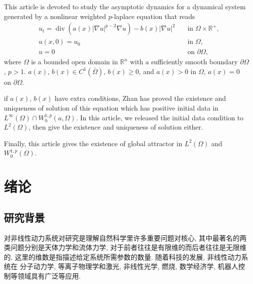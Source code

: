 \documentclass[twoside,longtitle]{LZUthesis}
\theoremstyle{definition}
\numberwithin{equation}{chapter}
\newcommand*\abs[1]{\lvert#1\rvert}
\newcommand\R{\mathbb{R}}
\DeclareMathOperator{\Div}{div}
\begin{document}

\begin{englishabstract}
This article is devoted to study the asymptotic dynamics for a dynamical system generated by a nonlinear
weighted $p$-laplace equation that reads
\begin{equation}\label{eq:main}
\begin{alignedat}{2}
& u_t = \Div(a(x)\abs{\nabla u}^{p-2}\nabla u) - b(x)\abs{\nabla u}^2 \quad &\text{in } \Omega \times \R^+,\\
& u(x,0) = u_0 \quad &\text{in } \Omega,\\
& u = 0 \quad &\text{on } \partial\Omega,
\end{alignedat}
\end{equation}
where $\Omega$ is a bounded open domain in $\R^{n}$ with a sufficiently smooth boundary $\partial\Omega$, $p>1$.
$ a(x)$, $b(x) \in C^1(\bar{\Omega}) $, $b(x) \geq 0$, and $a(x) > 0$ in $\Omega$, $a(x) = 0$ on $\partial\Omega$.

if $a(x)$, $b(x)$ have extra conditions, Zhan has proved the existence and uniqueness of solution of this equation
which has positive initial data in $L^{\infty}(\Omega) \cap W_0^{1,p}(a,\Omega)$. In this article, we released the
initial data condition to $L^2(\Omega)$, then give the existence and uniqueness of solution either.

Finally, this article gives the existence of global attractor in $L^2(\Omega)$ and $W_0^{1,p}(\Omega)$.
\end{englishabstract}


\tableofcontents{}


\mainmatter

\pagestyle{lzu}


\chapter{绪论}
\section{研究背景}
对非线性动力系统对研究是理解自然科学里许多重要问题对核心, 
其中最著名的两类问题分别是天体力学和流体力学, 
对于前者往往是有限维的而后者往往是无限维的, 
这里的维数是指描述给定系统所需参数的数量. 
随着科技的发展, 非线性动力系统在
分子动力学, 等离子物理学和激光, 非线性光学, 燃烧, 数学经济学, 机器人控制等领域具有广泛等应用. 
\end{document}
